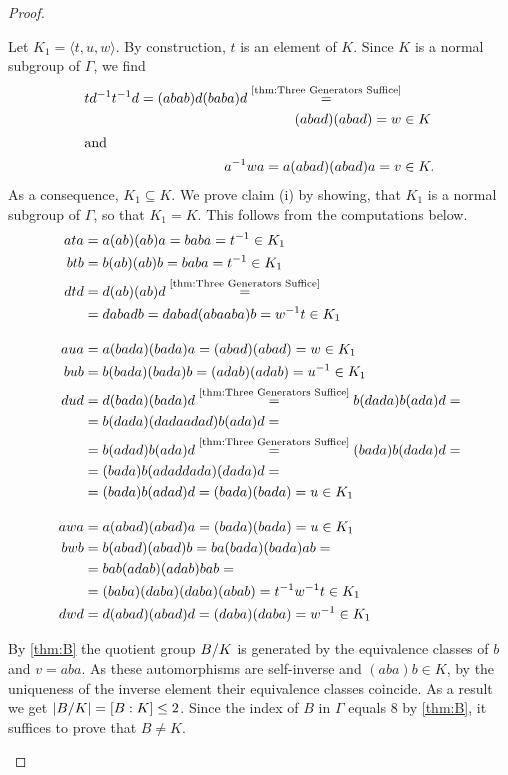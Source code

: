 \begin{proof}
\begin{plist}
\item Let $K_1=\langle t,u,w\rangle$. By construction, $t$ is an element of $K$. Since $K$ is a normal subgroup of $\Gamma$, we find
\begin{align*}
td^{-1}t^{-1}d=(abab)d(baba)d\overset{\text{\cref{thm:Three Generators Suffice}}}{=}&\\
(abad)(abad)=w&\in K\\
\intertext{and}
a^{-1}wa=a(abad)(abad)a=v&\in K.
\end{align*}
As a consequence, $K_1\subseteq K$. We prove claim (i) by showing, that $K_1$ is a normal subgroup of $\Gamma$, so that $K_1=K$. This follows from the computations below.
\begin{align*}
ata	&=a(ab)(ab)a=baba=t^{-1}\in K_1\\
btb	&=b(ab)(ab)b=baba=t^{-1}\in K_1\\
dtd	&=d(ab)(ab)d\overset{\text{\cref{thm:Three Generators Suffice}}}{=}\\
		&=dabadb=dabad(abaaba)b=w^{-1}t\in K_1\\[1em]
aua	&=a(bada)(bada)a=(abad)(abad)=w\in K_1\\
bub	&=b(bada)(bada)b=(adab)(adab)=u^{-1}\in K_1\\
dud	&=d(bada)(bada)d\overset{\text{\cref{thm:Three Generators Suffice}}}{=}b(dada)b(ada)d=\\
	&=b(dada)(dadaadad)b(ada)d=\\
	&=b(adad)b(ada)d\overset{\text{\cref{thm:Three Generators Suffice}}}{=}(bada)b(dada)d=\\
	&=(bada)b(adaddada)(dada)d=\\
	&=(bada)b(adad)d=(bada)(bada)=u\in K_1\\[1em]
awa	&=a(abad)(abad)a=(bada)(bada)=u\in K_1\\
bwb	&=b(abad)(abad)b=ba(bada)(bada)ab=\\
		&=bab(adab)(adab)bab=\\
		&=(baba)(daba)(daba)(abab)=t^{-1}w^{-1}t\in K_1\\
dwd	&=d(abad)(abad)d=(daba)(daba)=w^{-1}\in K_1
\end{align*}
\item\label{p:Index of K in Gamma} By \cref{thm:B} the quotient group $\nicefrac{B}{K}$ is generated by the equivalence classes of $b$ and $v=aba$. As these automorphisms are self-inverse and $(aba)b\in K$, by the uniqueness of the inverse element their equivalence classes  coincide. As a result we get $\lvert\nicefrac{B}{K}\rvert=[B:K]\leq 2$. Since the index of $B$ in $\Gamma$ equals 8 by \cref{thm:B}, it suffices to prove that $B\neq K$.


\end{plist}
\end{proof}

